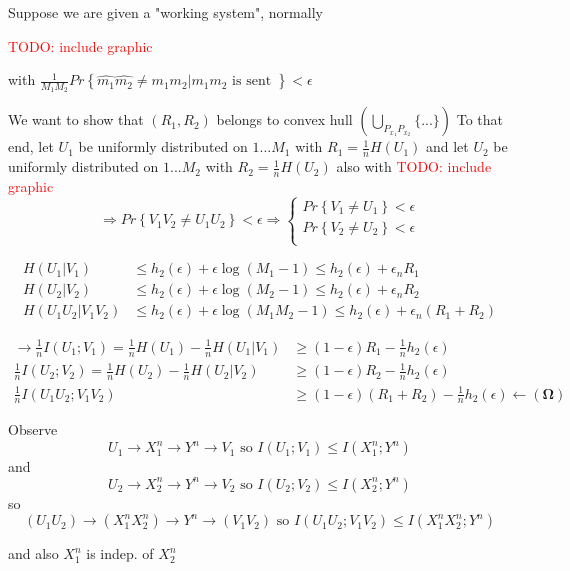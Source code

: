 \documentclass[twoside]{article}
\theoremstyle{definition} %
\newcommand{\todo}[1]{\textcolor{red}{TODO: #1}}
\renewcommand{\Pr}[1]{Pr\left\{#1\right\}}
\begin{document}
Suppose we are given a "working system", normally

\todo{include graphic}

with $\frac{1}{M_1 M_2} \Pr{\hat{m_1}\hat{m_2} \neq m_1 m_2 | m_1 m_2 \text{ is sent }} < \epsilon$

We want to show that $(R_1, R_2)$ belongs to convex hull $(\bigcup_{P_{x_1} P_{x_2}} \{...\})$
To that end, let $U_1$ be uniformly distributed on ${1 ... M_1}$ with $R_1 = \frac{1}{n} H(U_1)$ and let $U_2$ be uniformly distributed on ${1 ... M_2}$ with $R_2 = \frac{1}{n} H(U_2)$
also with \todo{include graphic}
\[
  \Rightarrow \Pr{V_1 V_2 \neq U_1 U_2} < \epsilon \Rightarrow
  \left\{
  \begin{array}{c}
    \Pr{V_1 \neq U_1} < \epsilon \\
    \Pr{V_2 \neq U_2} < \epsilon \\
  \end{array}
  \right.
\]


\begin{align*}
  H(U_1 | V_1) &\leq h_2(\epsilon) + \epsilon \log(M_1 - 1) \leq h_2(\epsilon) + \epsilon_n R_1 \\
  H(U_2 | V_2) &\leq h_2(\epsilon) + \epsilon \log(M_2 - 1) \leq h_2(\epsilon) + \epsilon_n R_2 \\
  H(U_1 U_2 | V_1 V_2) &\leq h_2(\epsilon) + \epsilon \log(M_1 M_2 - 1) \leq h_2(\epsilon) + \epsilon_n (R_1 + R_2)
\end{align*}

\begin{align*}
  \rightarrow \frac{1}{n} I(U_1; V_1) = \frac{1}{n} H(U_1) - \frac{1}{n} H(U_1 | V_1) &\geq (1 - \epsilon) R_1 - \frac{1}{n} h_2(\epsilon)\\
  \frac{1}{n} I(U_2; V_2) = \frac{1}{n} H(U_2) - \frac{1}{n} H(U_2 | V_2) &\geq (1 - \epsilon) R_2 - \frac{1}{n} h_2(\epsilon) \\
  \frac{1}{n} I(U_1 U_2; V_1 V_2) &\geq (1 - \epsilon) (R_1 + R_2) - \frac{1}{n} h_2(\epsilon) \leftarrow \mathbf{(\Omega)}
\end{align*}

Observe
\[
  U_1 \rightarrow X_1^n \rightarrow Y^n \rightarrow V_1 \text{ so } I(U_1 ; V_1) \leq I(X_1^n; Y^n)
\]
and
\[
  U_2 \rightarrow X_2^n \rightarrow Y^n \rightarrow V_2 \text{ so } I(U_2 ; V_2) \leq I(X_2^n; Y^n)
\]
so
\[
  (U_1 U_2) \rightarrow (X_1^n X_2^n) \rightarrow Y^n \rightarrow (V_1 V_2) \text{ so } I(U_1 U_2 ; V_1 V_2) \leq I(X_1^n X_2^n; Y^n)
\]

and also $X_1^n$ is indep. of $X_2^n$
\end{document}
